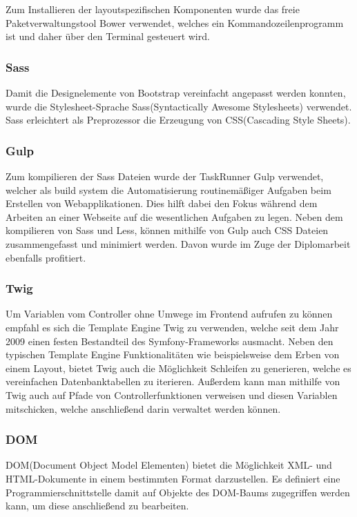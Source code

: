 	Zum Installieren der layoutspezifischen Komponenten wurde das freie Paketverwaltungstool Bower verwendet, welches ein Kommandozeilenprogramm ist und daher über den Terminal gesteuert wird.

    \subsubsection{Sass}

	Damit die Designelemente von Bootstrap vereinfacht angepasst werden konnten, wurde die Stylesheet-Sprache Sass(Syntactically Awesome Stylesheets) verwendet. Sass erleichtert als Preprozessor die Erzeugung von CSS(Cascading Style Sheets).

    \subsubsection{Gulp}

	Zum kompilieren der Sass Dateien wurde der TaskRunner Gulp verwendet, welcher als build system die Automatisierung routinemäßiger Aufgaben beim Erstellen von Webapplikationen. Dies hilft dabei den Fokus während dem Arbeiten an einer Webseite auf die wesentlichen Aufgaben zu legen. Neben dem kompilieren von Sass und Less, können mithilfe von Gulp auch CSS Dateien zusammengefasst und minimiert werden. Davon wurde im Zuge der Diplomarbeit ebenfalls profitiert.

    \subsubsection{Twig}

	Um Variablen vom Controller ohne Umwege im Frontend aufrufen zu können empfahl es sich die Template Engine Twig zu verwenden, welche seit dem Jahr 2009 einen festen Bestandteil des Symfony-Frameworks ausmacht. Neben den typischen Template Engine Funktionalitäten wie beispielsweise dem Erben von einem Layout, bietet Twig auch die Möglichkeit Schleifen zu generieren, welche es vereinfachen Datenbanktabellen zu iterieren. Außerdem kann man mithilfe von Twig auch auf Pfade von Controllerfunktionen verweisen und diesen Variablen mitschicken, welche anschließend darin verwaltet werden können.

    
    \subsubsection{DOM}

	DOM(Document Object Model Elementen) bietet die Möglichkeit XML- und HTML-Dokumente in einem bestimmten Format darzustellen. Es definiert eine Programmierschnittstelle damit auf Objekte des DOM-Baums zugegriffen werden kann, um diese anschließend zu bearbeiten.

